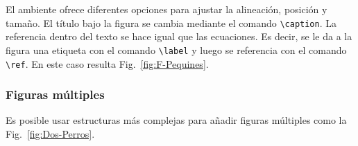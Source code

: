 El ambiente ofrece diferentes opciones para ajustar la alineación, posición y tamaño. El título bajo la figura se cambia mediante el comando \verb!\caption!. La referencia dentro del texto se hace igual que las ecuaciones. Es decir, se le da a la figura una etiqueta con el comando \verb!\label! y luego se referencia con el comando \verb!\ref!. En este caso resulta Fig.~\ref{fig:F-Pequines}.

\subsubsection{Figuras múltiples}
Es posible usar estructuras más complejas para añadir figuras múltiples como la Fig.~\ref{fig:Dos-Perros}.

\begin{figure}[h]
    \centering
    \begin{subfigure}[t]{0.4\textwidth}
        \end{subfigure}
    \begin{subfigure}[t]{0.3435\textwidth}
        \centering{%
}
\end{subfigure}
\end{figure}
